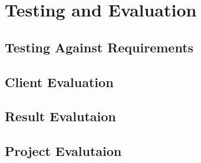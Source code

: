 \chapter{Testing and Evaluation}
\label{chapter7}

\section{Testing Against Requirements}
\lipsum[1-1] \cite{parikh1980adaptive}

\section{Client Evaluation}
\lipsum[1-1] \cite{parikh1980adaptive}

\section{Result Evalutaion}
\lipsum[1-1] \cite{parikh1980adaptive}

\section{Project Evalutaion}
\lipsum[1-1] \cite{parikh1980adaptive}